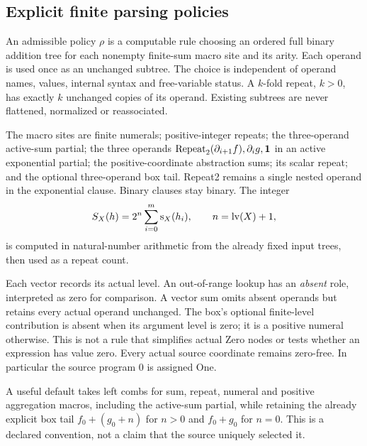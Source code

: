 \subsection{Explicit finite parsing policies}

\begin{definition}
An admissible policy $\rho$ is a computable rule choosing an ordered full
binary addition tree for each nonempty finite-sum macro site and its
arity. Each operand is used once as an unchanged subtree. The choice is
independent of operand names, values, internal syntax and free-variable
status. A $k$-fold repeat, $k>0$, has exactly $k$ unchanged copies of
its operand. Existing subtrees are never flattened, normalized or
reassociated.
\end{definition}

The macro sites are finite numerals; positive-integer repeats; the
three-operand active-sum partial; the three operands
$\operatorname{Repeat}_2(\partial_{i+1}f),\partial_i g,\mathbf1$ in an active exponential partial;
the positive-coordinate abstraction sums; its scalar repeat; and the
optional three-operand box tail. Repeat2 remains a single nested
operand in the exponential clause. Binary clauses stay binary. The
integer
\[
 S_X(h)=2^n\sum_{i=0}^m\operatorname{s}_X(h_i),
 \qquad n=\operatorname{lv}(X)+1,
\]
is computed in natural-number arithmetic from the already fixed input
trees, then used as a repeat count.

Each vector records its actual level. An out-of-range lookup has an
\emph{absent} role, interpreted as zero for comparison. A vector sum
omits absent operands but retains every actual operand unchanged. The
box's optional finite-level contribution is absent when its argument
level is zero; it is a positive numeral otherwise. This is not a rule
that simplifies actual Zero nodes or tests whether an expression has
value zero. Every actual source coordinate remains zero-free. In
particular the source program $0$ is assigned One.

A useful default takes left combs for sum, repeat, numeral and positive
aggregation macros, including the active-sum partial, while retaining
the already explicit box tail $f_0+(g_0+n)$ for $n>0$ and $f_0+g_0$
for $n=0$. This is a declared convention, not a claim that the source
uniquely selected it.

